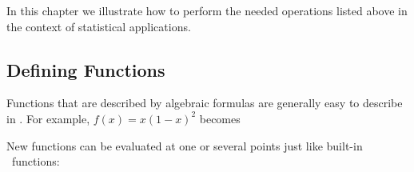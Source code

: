 

In this chapter we illustrate how to perform the needed operations listed above 
in the context of statistical applications.


\subsection{Defining Functions}
Functions that are described by algebraic formulas are generally easy to describe in \R.  For example, 
$f(x) = x (1-x)^2$ becomes
\begin{knitrout}
\end{knitrout}

New functions can be evaluated at one or several points just like built-in \R\ functions:
\begin{knitrout}
\end{knitrout}

